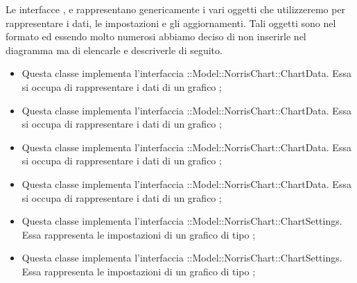 	Le interfacce ,  e  rappresentano genericamente i vari oggetti che utilizzeremo per rappresentare i dati, le impostazioni e gli aggiornamenti. Tali oggetti sono nel formato  ed essendo molto numerosi abbiamo deciso di non inserirle nel diagramma ma di elencarle e descriverle di seguito.

	\begin{itemize}
		\item {} Questa classe implementa l'interfaccia \linebreak {}::Model::NorrisChart::ChartData. Essa si occupa di rappresentare i dati di un grafico ;

		\item {} Questa classe implementa l'interfaccia \linebreak {}::Model::NorrisChart::ChartData. Essa si occupa di rappresentare i dati di un grafico ;

		\item {} Questa classe implementa l'interfaccia \linebreak {}::Model::NorrisChart::ChartData. Essa si occupa di rappresentare i dati di un grafico ;

		\item {} Questa classe implementa l'interfaccia \linebreak {}::Model::NorrisChart::ChartData. Essa si occupa di rappresentare i dati di un grafico ;

		\item {} Questa classe implementa l'interfaccia \linebreak {}::Model::NorrisChart::ChartSettings. Essa rappresenta le impostazioni di un grafico di tipo ;

		\item {} Questa classe implementa l'interfaccia \linebreak {}::Model::NorrisChart::ChartSettings. Essa rappresenta le impostazioni di un grafico di tipo ;


\end{itemize}
